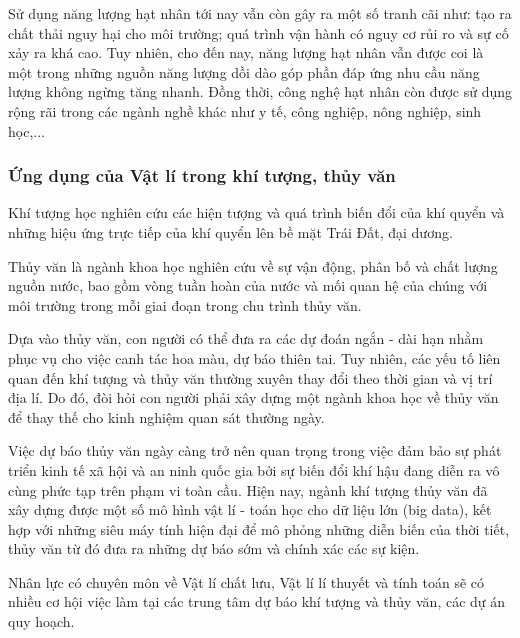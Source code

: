 Sử dụng năng lượng hạt nhân tới nay vẫn còn gây ra một số tranh cãi như: tạo ra chất thải nguy hại cho môi trường; quá trình vận hành có nguy cơ rủi ro và sự cố xảy ra khá cao. Tuy nhiên, cho đến nay, năng lượng hạt nhân vẫn được coi là một trong những nguồn năng lượng dồi dào góp phần đáp ứng nhu cầu năng lượng không ngừng tăng nhanh. Đồng thời, công nghệ hạt nhân còn được sử dụng rộng rãi trong các ngành nghề khác như y tế, công nghiệp, nông nghiệp, sinh học,...
\subsubsection{Ứng dụng của Vật lí trong khí tượng, thủy văn}
Khí tượng học nghiên cứu các hiện tượng và quá trình biến đổi của khí quyển và những hiệu ứng trực tiếp của khí quyển lên bề mặt Trái Đất, đại dương.

Thủy văn là ngành khoa học nghiên cứu về sự vận động, phân bố và chất lượng nguồn nước, bao gồm vòng tuần hoàn của nước và mối quan hệ của chúng với môi trường trong mỗi giai đoạn trong chu trình thủy văn.

Dựa vào thủy văn, con người có thể đưa ra các dự đoán ngắn - dài hạn nhằm phục vụ cho việc canh tác hoa màu, dự báo thiên tai. Tuy nhiên, các yếu tố liên quan đến khí tượng và thủy văn thường xuyên thay đổi theo thời gian và vị trí địa lí. Do đó, đòi hỏi con người phải xây dựng một ngành khoa học về thủy văn để thay thế cho kinh nghiệm quan sát thường ngày.

Việc dự báo thủy văn ngày càng trở nên quan trọng trong việc đảm bảo sự phát triển kinh tế xã hội và an ninh quốc gia bởi sự biến đổi khí hậu đang diễn ra vô cùng phức tạp trên phạm vi toàn cầu. Hiện nay, ngành khí tượng thủy văn đã xây dựng được một số mô hình vật lí - toán học cho dữ liệu lớn (big data), kết hợp với những siêu máy tính hiện đại để mô phỏng những diễn biến của thời tiết, thủy văn từ đó đưa ra những dự báo sớm và chính xác các sự kiện.

Nhân lực có chuyên môn về Vật lí chất lưu, Vật lí lí thuyết và tính toán sẽ có nhiều cơ hội việc làm tại các trung tâm dự báo khí tượng và thủy văn, các dự án quy hoạch.

